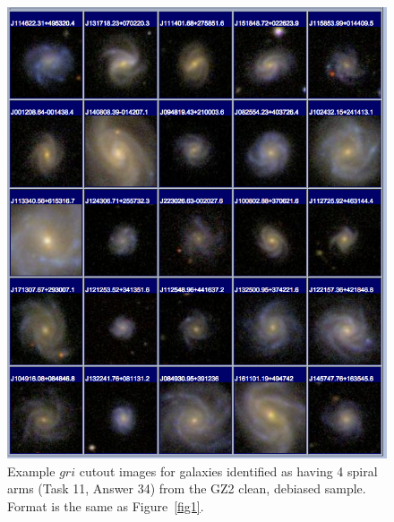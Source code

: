 \documentclass[useAMS,usenatbib]{mn2e}
\begin{document}
\newpage
\clearpage
\begin{figure}
\includegraphics[angle=0,width=7.0in]{figures/gallery/spiral4.png}
\caption{Example $gri$ cutout images for galaxies identified as having 4 spiral arms (Task 11, Answer 34) from the GZ2 clean, debiased sample. Format is the same as Figure~\ref{fig1}.}
\end{figure}
\end{document}
